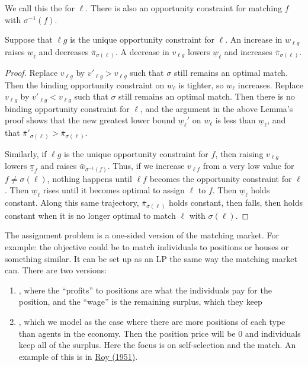 \documentclass[10pt]{article}
\begin{document}
\begin{remark}
	We call this the  for $\ell$. There is also an opportunity constraint for matching $f$ with $\sigma^{-1}(f)$.
	
	\begin{theorem}
		Suppose that $\ell g$ is the unique opportunity constraint for $\ell$. An increase in $w_{\ell g}$ raises $\underline{w}_\ell$ and decreases $\bar{\pi}_{\sigma(\ell)}$. A decrease in $v_{\ell g}$ lowers $\underline{w}_\ell$ and increases $\bar{\pi}_{\sigma(\ell)}$. 
	\end{theorem}
	\begin{proof}
		Replace $v_{\ell g}$ by $v'_{\ell g} > v_{\ell g}$ such that $\sigma$ still remains an optimal match. Then the binding opportunity constraint on $w_\ell$ is tighter, so $w_\ell$ increases. Replace $v_{\ell g}$ by $v'_{\ell g} < v_{\ell g}$ such that $\sigma$ still remains an optimal match. Then there is no binding opportunity constraint for $\ell$, and the argument in the above Lemma's proof shows that the new greatest lower bound $\underline{w}_\ell'$ on $w_\ell$ is less than $\underline{w}_\ell$, and that $\bar{\pi}'_{\sigma(\ell)} > \bar{\pi}_{\sigma(\ell)}$.
		
		Similarly, if $\ell g$ is the unique opportunity constraint for $f$, then raising $v_{\ell g}$ lowers $\underline{\pi}_f$ and raises $\bar{w}_{\sigma^{-1}(f)}$. Thus, if we increase $v_{\ell f}$ from a very low value for $f \ne \sigma(\ell)$, nothing happens until $\ell f$ becomes the opportunity constraint for $\ell$. Then $\underline{w}_\ell$ rises until it becomes optimal to assign $\ell$ to $f$. Then $\underline{w}_\ell$ holds constant. Along this same trajectory, $\bar{\pi}_{\sigma(\ell)}$ holds constant, then falls, then holds constant when it is no longer optimal to match $\ell$ with $\sigma(\ell)$. 
	\end{proof}
\end{remark}


\begin{model}
	 The assignment problem is a one-sided version of the matching market. For example: the objective could be to match individuals to positions or houses or something similar. It can be set up as an LP the same way the matching market can. There are two versions:
	\begin{enumerate}
		\item {}, where the ``profits'' to positions are what the individuals pay for the position, and the ``wage'' is the remaining surplus, which they keep
		\item {}, which we model as the case where there are more positions of each type than agents in the economy. Then the position price will be 0 and individuals keep all of the surplus. Here the focus is on self-selection and the match. An example of this is in \href{https://www.jstor.org/stable/2662082?seq=1}{Roy (1951)}.
	\end{enumerate}
\end{model}
\end{document}
